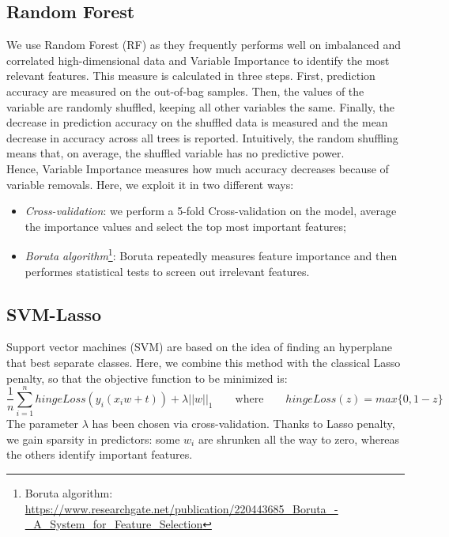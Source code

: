 \documentclass[a4paper,11pt, oneside]{article}  %
\begin{document}
\subsection{Random Forest}
We use Random Forest (RF) as they frequently performs well on imbalanced and correlated high-dimensional data and Variable Importance to identify the most relevant features.  This measure is calculated in three steps. First, prediction accuracy are measured on the out-of-bag samples. Then, the values of the variable are randomly shuffled, keeping all other variables the same.  Finally, the decrease in prediction accuracy on the shuffled data is measured and the mean decrease in accuracy across all trees is reported.  Intuitively, the random shuffling means that, on average, the shuffled variable has no predictive power. \\
Hence, Variable Importance measures how much accuracy decreases because of variable removals. Here, we exploit it in two different ways:
\begin{itemize}
	\item \textit{Cross-validation}: we perform a 5-fold Cross-validation on the model, average the importance values and select the top most important features;
	\item \textit{Boruta algorithm}\footnote{Boruta algorithm: \url{https://www.researchgate.net/publication/220443685_Boruta_-_A_System_for_Feature_Selection}}: Boruta repeatedly measures feature importance and then performes statistical tests to screen out irrelevant features. 
\end{itemize} 

\subsection{SVM-Lasso}
Support vector machines (SVM) are based on the idea of finding an hyperplane that best separate classes. Here, we combine this method with the classical Lasso penalty,  so that the objective function to be minimized is:
\begin{equation*}
	\dfrac{1}{n} \sum_{i=1}^n hingeLoss(y_i(x_i w + t)) + \lambda ||w||_1  \qquad	\text{where} \qquad  hingeLoss(z) = max\{0, 1-z\}
\end{equation*}
The parameter $\lambda$ has been chosen via cross-validation. Thanks to Lasso penalty, we gain sparsity in predictors: some $w_i$ are shrunken all the way to zero,  whereas the others identify important features. 
\end{document}

